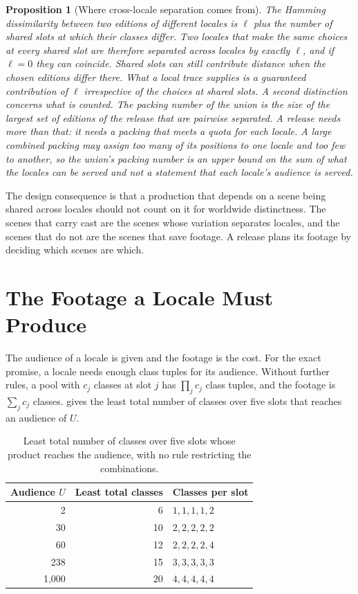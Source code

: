 \documentclass[11pt,twoside,openright]{book}
\theoremstyle{plain}
\newtheorem{proposition}[theorem]{Proposition}
\theoremstyle{definition}
\theoremstyle{remark}
\begin{document}
\begin{proposition}[Where cross-locale separation comes from]\label{prop:source}
The Hamming dissimilarity between two editions of different locales is $\ell$ plus the number of shared slots at which their classes differ. Two locales that make the same choices at every shared slot are therefore separated across locales by exactly $\ell$, and if $\ell=0$ they can coincide. Shared slots can still contribute distance when the chosen editions differ there. What a local trace supplies is a guaranteed contribution of $\ell$ irrespective of the choices at shared slots. A second distinction concerns what is counted. The packing number of the union is the size of the largest set of editions of the release that are pairwise separated. A release needs more than that: it needs a packing that meets a quota for each locale. A large combined packing may assign too many of its positions to one locale and too few to another, so the union's packing number is an upper bound on the sum of what the locales can be served and not a statement that each locale's audience is served.
\end{proposition}

The design consequence is that a production that depends on a scene being shared across locales should not count on it for worldwide distinctness. The scenes that carry cast are the scenes whose variation separates locales, and the scenes that do not are the scenes that save footage. A release plans its footage by deciding which scenes are which.

\section{The Footage a Locale Must Produce}\label{sec:footage11}

The audience of a locale is given and the footage is the cost. For the exact promise, a locale needs enough class tuples for its audience. Without further rules, a pool with $c_j$ classes at slot $j$ has $\prod_jc_j$ class tuples, and the footage is $\sum_jc_j$ classes.  gives the least total number of classes over five slots that reaches an audience of $U$.

\begin{table}[ht]
\centering
\begin{tabular}{@{}rrl@{}}
\toprule
Audience $U$ & Least total classes & Classes per slot\\
\midrule
2 & 6 & $1,1,1,1,2$\\
30 & 10 & $2,2,2,2,2$\\
60 & 12 & $2,2,2,2,4$\\
238 & 15 & $3,3,3,3,3$\\
1{,}000 & 20 & $4,4,4,4,4$\\
\bottomrule
\end{tabular}
\caption{Least total number of classes over five slots whose product reaches the audience, with no rule restricting the combinations.}\label{tab:foot11}
\end{table}
\end{document}
